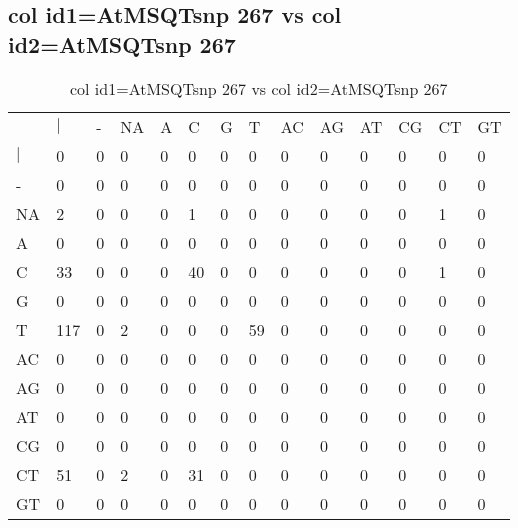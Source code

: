 \subsection{col id1=AtMSQTsnp 267 vs col id2=AtMSQTsnp 267}
\begin{center}
\begin{longtable}{|l|l|l|l|l|l|l|l|l|l|l|l|l|l|}
\caption{col id1=AtMSQTsnp 267 vs col id2=AtMSQTsnp 267} \label{table_dm806}\\
\hline
\\
\hline
&$|$&-&NA&A&C&G&T&AC&AG&AT&CG&CT&GT\\
$|$&0&0&0&0&0&0&0&0&0&0&0&0&0\\
-&0&0&0&0&0&0&0&0&0&0&0&0&0\\
NA&2&0&0&0&1&0&0&0&0&0&0&1&0\\
A&0&0&0&0&0&0&0&0&0&0&0&0&0\\
C&33&0&0&0&40&0&0&0&0&0&0&1&0\\
G&0&0&0&0&0&0&0&0&0&0&0&0&0\\
T&117&0&2&0&0&0&59&0&0&0&0&0&0\\
AC&0&0&0&0&0&0&0&0&0&0&0&0&0\\
AG&0&0&0&0&0&0&0&0&0&0&0&0&0\\
AT&0&0&0&0&0&0&0&0&0&0&0&0&0\\
CG&0&0&0&0&0&0&0&0&0&0&0&0&0\\
CT&51&0&2&0&31&0&0&0&0&0&0&0&0\\
GT&0&0&0&0&0&0&0&0&0&0&0&0&0\\
\hline
\end{longtable}
\end{center}


